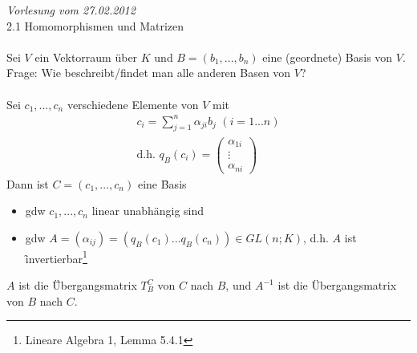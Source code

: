 \newpage
\noindent \textit{Vorlesung vom 27.02.2012} \\
\f{2.1 Homomorphismen und Matrizen} \\\\ %
Sei $V$ ein Vektorraum über $K$ und $B = (b_1, ..., b_n)$ eine (geordnete) Basis von $V$.\\
\f{Frage:} Wie beschreibt/findet man alle anderen Basen von $V$? \\\\
Sei $c_1, ..., c_n$ verschiedene Elemente von $V$ mit
\begin{align}
c_i = \sum_{j=1}^{n} \alpha_{ji} b_j \,\,(i = 1...n) \\
\text{d.h. } q_B (c_i) = \begin{pmatrix} \alpha_{1i} \\ \vdots \\ \alpha_{ni} \end{pmatrix}
\end{align}
Dann ist $C = (c_1, ..., c_n)$ eine \f{Basis} 
\begin{itemize}
 \item gdw $c_1, ..., c_n$ linear unabhängig sind
 \item gdw $A = (\alpha_{ij}) = (q_B(c_1) ... q_B (c_n)) \in GL(n;K)$, d.h. $A$ ist \f{invertierbar}\footnote{Lineare Algebra 1, Lemma 5.4.1}
\end{itemize}
$A$ ist die \f{Übergangsmatrix} $T_{B}^{C}$ von $C$ nach $B$, und $A^{-1}$ ist die Übergangsmatrix von $B$ nach $C$.

